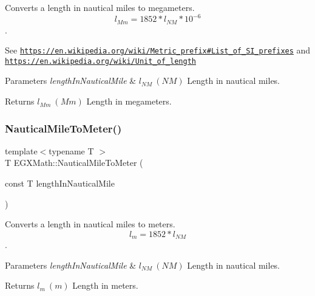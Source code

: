 Converts a length in nautical miles to megameters. \[ l_{Mm}=1852 * l_{NM} * 10^{-6} \]. 

See \href{https://en.wikipedia.org/wiki/Metric_prefix#List_of_SI_prefixes}{\tt https\+://en.\+wikipedia.\+org/wiki/\+Metric\+\_\+prefix\#\+List\+\_\+of\+\_\+\+S\+I\+\_\+prefixes} and \href{https://en.wikipedia.org/wiki/Unit_of_length}{\tt https\+://en.\+wikipedia.\+org/wiki/\+Unit\+\_\+of\+\_\+length} 
\begin{DoxyParams}{Parameters}
{\em length\+In\+Nautical\+Mile} & $ l_{NM}\ (NM)$ Length in nautical miles. \\
\hline
\end{DoxyParams}
\begin{DoxyReturn}{Returns}
$ l_{Mm}\ (Mm)$ Length in megameters. 
\end{DoxyReturn}
\mbox{\label{group___e_g_x_math-_conversions-_length_conversions-_nautical-_nautical_mile-_s_i_ga828e054a1ecb313ed21e6f581110b164}} 
\subsubsection{\texorpdfstring{Nautical\+Mile\+To\+Meter()}{NauticalMileToMeter()}}
{\footnotesize\ttfamily template$<$typename T $>$ \\
T E\+G\+X\+Math\+::\+Nautical\+Mile\+To\+Meter (\begin{DoxyParamCaption}\item[{const T}]{length\+In\+Nautical\+Mile }\end{DoxyParamCaption})}



Converts a length in nautical miles to meters. \[ l_{m}=1852 * l_{NM} \]. 


\begin{DoxyParams}{Parameters}
{\em length\+In\+Nautical\+Mile} & $ l_{NM}\ (NM)$ Length in nautical miles. \\
\hline
\end{DoxyParams}
\begin{DoxyReturn}{Returns}
$ l_{m}\ (m)$ Length in meters. 
\end{DoxyReturn}
\mbox{\label{group___e_g_x_math-_conversions-_length_conversions-_nautical-_nautical_mile-_s_i_ga8ce271a279676a3461dddc59c6a9720b}} 

